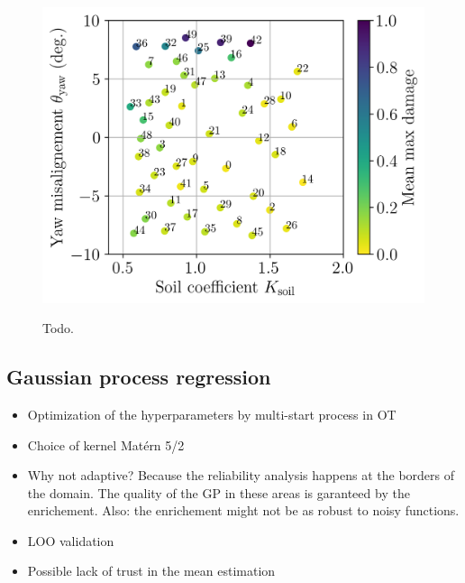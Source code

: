 \begin{figure}
    \centering
    \includegraphics[width=0.6\linewidth]{./part3/figures/OWT/normalized_results_mean.png}
    \label{fig:evaluated_doe}
    \caption{Todo.}
\end{figure}


\subsection{Gaussian process regression}
\begin{itemize}
    \item Optimization of the hyperparameters by multi-start process in OT 
    \item Choice of kernel Matérn 5/2
    \item Why not adaptive? Because the reliability analysis happens at the borders of the domain. The quality of the GP in these areas is garanteed by the enrichement. Also: the enrichement might not be as robust to noisy functions. 
    \item LOO validation 
    \item Possible lack of trust in the mean estimation
\end{itemize}




